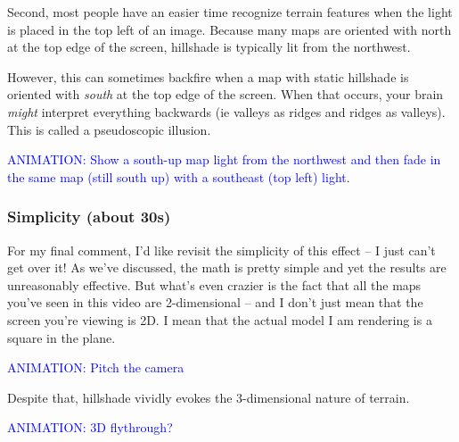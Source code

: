 \documentclass{article}
\newcommand\animation[1]{\textcolor{blue}{ANIMATION: #1}}
\begin{document}
Second, most people have an easier time recognize terrain features when the light is placed in the top left of an image.
Because many maps are oriented with north at the top edge of the screen, hillshade is typically lit from the northwest.

However, this can sometimes backfire when a map with static hillshade is oriented with \textit{south} at the top edge of the screen.
When that occurs, your brain \textit{might} interpret everything backwards (ie valleys as ridges and ridges as valleys).
This is called a pseudoscopic illusion.

\animation{Show a south-up map light from the northwest and then fade in the same map (still south up) with a southeast (top left) light}.

\subsubsection{Simplicity (about 30s)}

For my final comment, I'd like revisit the simplicity of this effect -- I just can't get over it!
As we've discussed, the math is pretty simple and yet the results are unreasonably effective.
But what's even crazier is the fact that all the maps you've seen in this video are 2-dimensional -- and I don't just mean that the screen you're viewing is 2D.
I mean that the actual model I am rendering is a square in the plane.

\animation{Pitch the camera}

Despite that, hillshade vividly evokes the 3-dimensional nature of terrain.

\animation{3D flythrough?}
\end{document}

